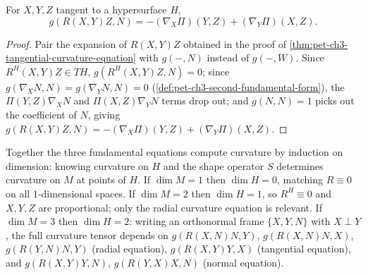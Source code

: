 \begin{theorem}
  \label{thm:pet-ch3-normal-curvature-equation}
  \leanok
  For $X,Y,Z$ tangent to a hypersurface $H$,
  \[
    g(R(X,Y)Z,N)=-(\nabla_X\Pi)(Y,Z)+(\nabla_Y\Pi)(X,Z).
  \]
\end{theorem}
\begin{proof}
  Pair the expansion of $R(X,Y)Z$ obtained in the proof of
  \cref{thm:pet-ch3-tangential-curvature-equation} with $g(-,N)$ instead of
  $g(-,W)$. Since $R^H(X,Y)Z\in TH$, $g(R^H(X,Y)Z,N)=0$; since
  $g(\nabla_XN,N)=g(\nabla_YN,N)=0$ (\cref{def:pet-ch3-second-fundamental-form}),
  the $\Pi(Y,Z)\nabla_XN$ and $\Pi(X,Z)\nabla_YN$ terms drop out; and $g(N,N)=1$
  picks out the coefficient of $N$, giving
  $g(R(X,Y)Z,N)=-(\nabla_X\Pi)(Y,Z)+(\nabla_Y\Pi)(X,Z)$.
\end{proof}

\begin{remark}
  \label{rem:pet-ch3-curvature-equations-by-dimension}
  \leanok
  Together the three fundamental equations compute curvature by induction on
  dimension: knowing curvature on $H$ and the shape operator $S$ determines
  curvature on $M$ at points of $H$. If $\dim M=1$ then $\dim H=0$, matching
  $R\equiv0$ on all $1$-dimensional spaces. If $\dim M=2$ then $\dim H=1$, so
  $R^H\equiv0$ and $X,Y,Z$ are proportional; only the radial curvature equation
  is relevant. If $\dim M=3$ then $\dim H=2$: writing an orthonormal frame
  $\{X,Y,N\}$ with $X\perp Y$, the full curvature tensor depends on
  $g(R(X,N)N,Y)$, $g(R(X,N)N,X)$, $g(R(Y,N)N,Y)$ (radial equation),
  $g(R(X,Y)Y,X)$ (tangential equation), and $g(R(X,Y)Y,N)$, $g(R(Y,X)X,N)$
  (normal equation).
\end{remark}

